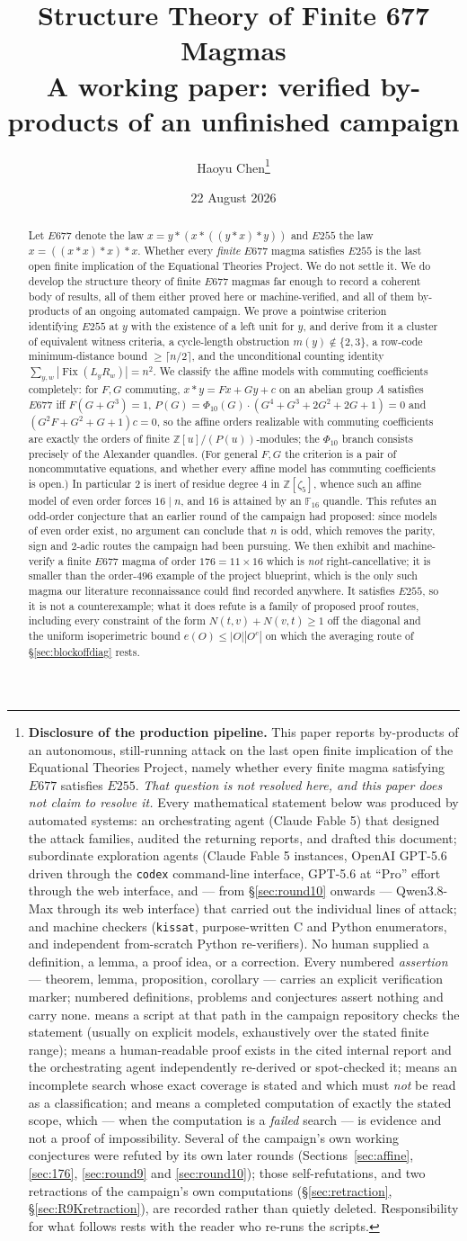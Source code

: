 \documentclass[11pt]{article}
\title{Structure Theory of Finite 677 Magmas\\
{\large A working paper: verified by-products of an unfinished campaign}}
\author{Haoyu Chen\thanks{%
\textbf{Disclosure of the production pipeline.}
This paper reports by-products of an autonomous, still-running attack on the last open
finite implication of the Equational Theories Project, namely whether every finite magma
satisfying $E677$ satisfies $E255$. \emph{That question is not resolved here, and this paper
does not claim to resolve it.} Every mathematical statement below was produced by automated
systems: an orchestrating agent (Claude Fable 5) that designed the attack families, audited
the returning reports, and drafted this document; subordinate exploration agents (Claude
Fable 5 instances, OpenAI GPT-5.6 driven through the \texttt{codex} command-line interface,
GPT-5.6 at ``Pro'' effort through the web interface, and --- from \S\ref{sec:round10}
onwards --- Qwen3.8-Max through its web interface) that carried out the individual
lines of attack; and machine checkers (\texttt{kissat}, purpose-written C and Python
enumerators, and independent from-scratch Python re-verifiers). No human supplied a
definition, a lemma, a proof idea, or a correction.
Every numbered \emph{assertion} --- theorem, lemma, proposition, corollary --- carries an
explicit verification marker; numbered definitions, problems and conjectures assert
nothing and carry none.
\statusbox{machine-verified: \texttt{path}} means a script at that path in the campaign
repository checks the statement (usually on explicit models, exhaustively over the stated
finite range); \statusbox{proved in $X$, root-verified} means a human-readable proof exists
in the cited internal report and the orchestrating agent independently re-derived or
spot-checked it; \statusbox{computational, partial: $\dots$} means an incomplete search
whose exact coverage is stated and which must \emph{not} be read as a classification; and
\statusbox{computational: $\dots$} means a completed computation of exactly the stated
scope, which --- when the computation is a \emph{failed} search --- is evidence and not a
proof of impossibility.
Several of the campaign's own working conjectures were refuted by its own later rounds
(Sections~\ref{sec:affine}, \ref{sec:176}, \ref{sec:round9} and \ref{sec:round10}); those
self-refutations, and two retractions of the campaign's own computations
(\S\ref{sec:retraction}, \S\ref{sec:R9Kretraction}), are recorded rather
than quietly deleted. Responsibility for what follows rests with the reader who re-runs the
scripts.}}
\date{22 August 2026}
\theoremstyle{plain}
\theoremstyle{definition}
\theoremstyle{remark}
\numberwithin{equation}{section}
\newcommand{\Z}{\mathbb{Z}}
\newcommand{\F}{\mathbb{F}}
\newcommand{\op}{\mathbin{*}}
\newcommand{\Fix}{\operatorname{Fix}}
\begin{document}
\maketitle

\begin{abstract}
Let $E677$ denote the law $x = y \op (x \op ((y \op x) \op y))$ and $E255$ the law
$x = ((x\op x)\op x)\op x$. Whether every \emph{finite} $E677$ magma satisfies $E255$ is the
last open finite implication of the Equational Theories Project. We do not settle it. We do
develop the structure theory of finite $E677$ magmas far enough to record a coherent body of
results, all of them either proved here or machine-verified, and all of them by-products of
an ongoing automated campaign.
We prove a pointwise criterion identifying $E255$ at $y$ with the existence of a left unit
for $y$, and derive from it a cluster of equivalent witness criteria, a cycle-length
obstruction $m(y)\notin\{2,3\}$, a row-code minimum-distance bound $\ge \lceil n/2\rceil$,
and the unconditional counting identity $\sum_{y,w}|\Fix(L_y R_w)| = n^2$.
We classify the affine models with commuting coefficients completely: for $F,G$ commuting,
$x\op y = Fx+Gy+c$ on an abelian group $A$
satisfies $E677$ iff $F(G+G^3)=1$, $P(G)=\Phi_{10}(G)\cdot(G^4+G^3+2G^2+2G+1)=0$ and
$(G^2F+G^2+G+1)c=0$, so the affine orders
realizable with commuting coefficients are exactly the orders of finite
$\Z[u]/(P(u))$-modules; the
$\Phi_{10}$ branch consists precisely of the Alexander quandles. (For general $F,G$ the
criterion is a pair of noncommutative equations, and whether every affine model has
commuting coefficients is open.) In particular $2$ is inert
of residue degree $4$ in $\Z[\zeta_5]$, whence such an affine model of even order forces
$16 \mid n$, and $16$ is attained by an $\F_{16}$ quandle. This refutes an odd-order
conjecture that an earlier round of the campaign had proposed: since models of even order
exist, no argument can conclude that $n$ is odd, which removes the parity, sign and $2$-adic
routes the campaign had been pursuing.
We then exhibit and machine-verify a finite $E677$ magma of order $176 = 11\times 16$ which is
\emph{not} right-cancellative; it is smaller than the order-$496$ example of the project
blueprint, which is the only such magma our literature reconnaissance could find recorded
anywhere. It satisfies $E255$, so it is
not a counterexample; what it does refute is a family of proposed proof routes,
including every constraint of the form $N(t,v)+N(v,t)\ge 1$ off the diagonal and the
uniform isoperimetric bound $e(O)\le |O||O^c|$ on which the averaging route of \S\ref{sec:blockoffdiag} rests.

\end{abstract}
\end{document}
